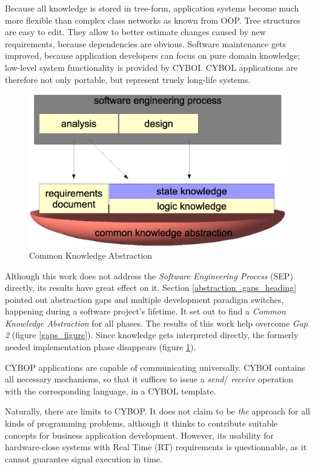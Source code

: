 Because all knowledge is stored in tree-form, application systems become much
more flexible than complex class networks as known from OOP. Tree structures
are easy to edit. They allow to better estimate changes caused by new
requirements, because dependencies are obvious. Software maintenance gets
improved, because application developers can focus on pure domain knowledge;
low-level system functionality is provided by CYBOI. CYBOL applications are
therefore not only portable, but represent truely long-life systems.

\begin{figure}[ht]
    \begin{center}
        \includegraphics[scale=0.2]{vector/common.eps}
        \caption{Common Knowledge Abstraction}
        \label{common_figure}
    \end{center}
\end{figure}

Although this work does not address the \emph{Software Engineering Process}
(SEP) directly, its results have great effect on it. Section
\ref{abstraction_gaps_heading} pointed out abstraction gaps and multiple
development paradigm switches, happening during a software project's lifetime.
It set out to find a \emph{Common Knowledge Abstraction} for all phases. The
results of this work help overcome \emph{Gap 2} (figure \ref{gaps_figure}).
Since knowledge gets interpreted directly, the formerly needed implementation
phase disappears (figure \ref{common_figure}).

CYBOP applications are capable of communicating universally. CYBOI contains all
necessary mechanisms, so that it suffices to issue a \emph{send}/
\emph{receive} operation with the corresponding language, in a CYBOL template.

Naturally, there are limits to CYBOP. It does not claim to be \emph{the}
approach for all kinds of programming problems, although it thinks to
contribute suitable concepts for business application development. However, its
usability for hardware-close systems with Real Time (RT) requirements is
questionnable, as it cannot guarantee signal execution in time.
